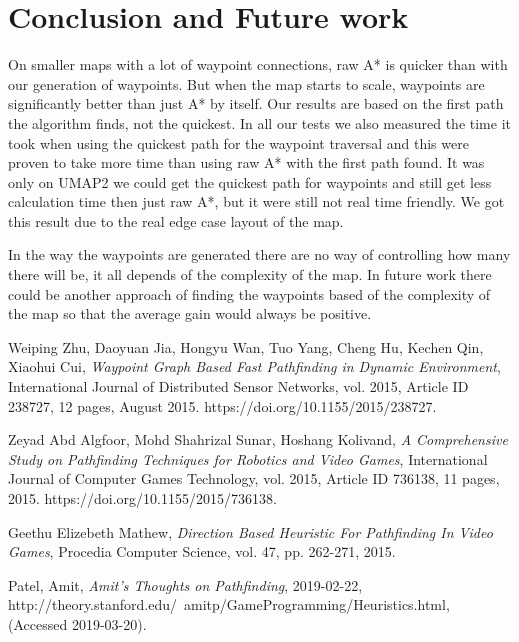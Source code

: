 \documentclass[a4paper]{article}
\begin{document}
\section{Conclusion and Future work}
On smaller maps with a lot of waypoint connections, raw A* is quicker than with our generation of waypoints. But when the map starts to scale, waypoints are significantly better than just A* by itself.
Our results are based on the first path the algorithm finds, not the quickest. In all our tests we also measured the time it took when using the quickest path for the waypoint traversal and this were proven to take more time than using raw A* with the first path found. It was only on UMAP2 we could get the quickest path for waypoints and still get less calculation time then just raw A*, but it were still not real time friendly. We got this result due to the real edge case layout of the map.
	
In the way the waypoints are generated there are no way of controlling how many there will be, it all depends of the complexity of the map. In future work there could be another approach of finding the waypoints based of the complexity of the map so that the average gain would always be positive.

\pagebreak
\begin{thebibliography}{9}

  Weiping Zhu, Daoyuan Jia, Hongyu Wan, Tuo Yang, Cheng Hu, Kechen Qin, Xiaohui Cui,
  \textit{Waypoint Graph Based Fast Pathfinding in Dynamic Environment},
  International Journal of Distributed Sensor Networks, vol. 2015, Article ID 238727, 12 pages,
  August 2015. https://doi.org/10.1155/2015/238727.

  Zeyad Abd Algfoor, Mohd Shahrizal Sunar, Hoshang Kolivand,
  \textit{A Comprehensive Study on Pathfinding Techniques for Robotics and Video Games},
  International Journal of Computer Games Technology, vol. 2015, Article ID 736138, 11 pages,
  2015. https://doi.org/10.1155/2015/736138.

  Geethu Elizebeth Mathew,
  \textit{Direction Based Heuristic For Pathfinding In Video Games},
  Procedia Computer Science, vol. 47, pp. 262-271,
  2015.

   Patel, Amit,
  \textit{Amit's Thoughts on Pathfinding},
  2019-02-22,
  http://theory.stanford.edu/~amitp/GameProgramming/Heuristics.html,
  (Accessed 2019-03-20).


\end{thebibliography}
\end{document}
